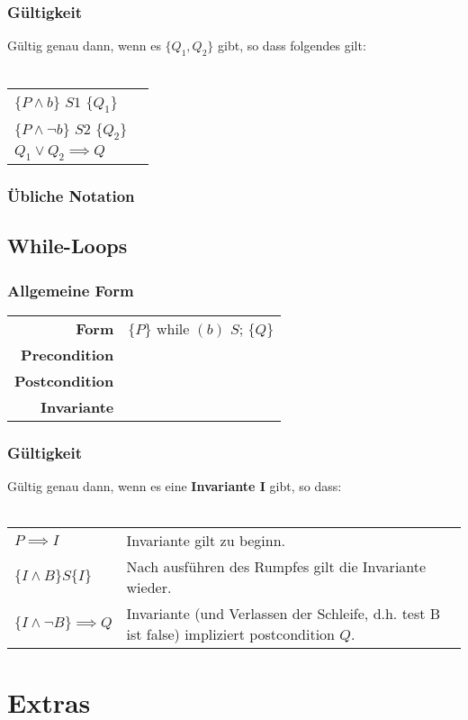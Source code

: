 \documentclass[12pt,a4paper]{article}
\begin{document}
\subsubsection{Gültigkeit}
Gültig genau dann, wenn es $\{Q_1, Q_2\}$ gibt, so dass folgendes gilt:\\\\
\begin{tabular}{ll}
$\{P \land b\}$ $S1$ $\{Q_1\}$\\
$\{P \land \neg b \}$ $S2$ $\{Q_2\}$\\
$Q_1 \lor Q_2 \implies Q$
\end{tabular}
\subsubsection{Übliche Notation}

\subsection{While-Loops}
\subsubsection{Allgemeine Form}
\begin{tabularx}{\linewidth}{r X}
\textbf{Form} & $\{P\}$ while $(b)$ $S$; $\{Q\}$\\ %
\textbf{Precondition} & \\
\textbf{Postcondition} & \\
\textbf{Invariante} & 
\end{tabularx}
\subsubsection{Gültigkeit}
Gültig genau dann, wenn es eine \textbf{Invariante I} gibt, so dass:\\\\
\begin{tabularx}{\linewidth}{lX}
$P \implies I$ & Invariante gilt zu beginn.\\
$\{I \land B\} S \{I\}$ & Nach ausführen des Rumpfes gilt die Invariante wieder.\\
$\{I \land \neg B\} \implies Q$ & Invariante (und Verlassen der Schleife, d.h. test B ist false) impliziert postcondition $Q$.
\end{tabularx}
\section{Extras}
\end{document}
